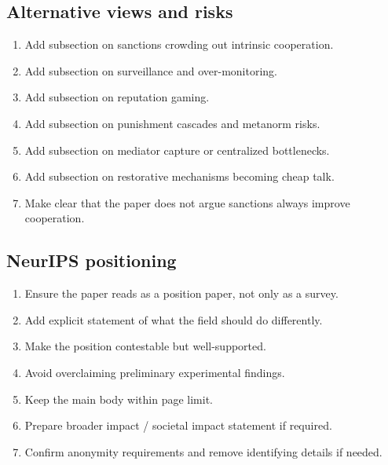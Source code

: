 \subsection*{Alternative views and risks}
\begin{enumerate}
  \item[$\square$] Add subsection on sanctions crowding out intrinsic cooperation.
  \item[$\square$] Add subsection on surveillance and over-monitoring.
  \item[$\square$] Add subsection on reputation gaming.
  \item[$\square$] Add subsection on punishment cascades and metanorm risks.
  \item[$\square$] Add subsection on mediator capture or centralized bottlenecks.
  \item[$\square$] Add subsection on restorative mechanisms becoming cheap talk.
  \item[$\square$] Make clear that the paper does not argue sanctions always improve cooperation.
\end{enumerate}

\subsection*{NeurIPS positioning}
\begin{enumerate}
  \item[$\square$] Ensure the paper reads as a position paper, not only as a survey.
  \item[$\square$] Add explicit statement of what the field should do differently.
  \item[$\square$] Make the position contestable but well-supported.
  \item[$\square$] Avoid overclaiming preliminary experimental findings.
  \item[$\square$] Keep the main body within page limit.
  \item[$\square$] Prepare broader impact / societal impact statement if required.
  \item[$\square$] Confirm anonymity requirements and remove identifying details if needed.
\end{enumerate}

